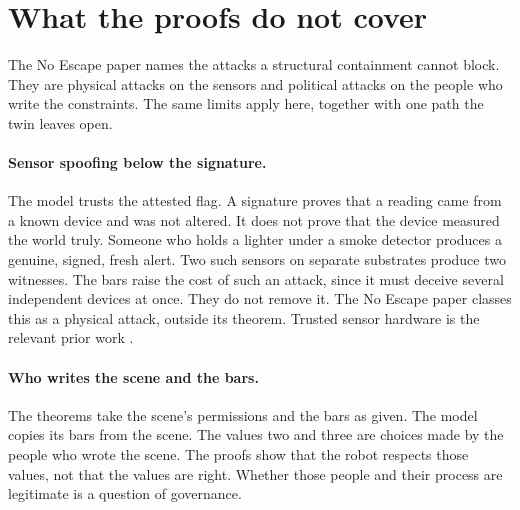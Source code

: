 \section{What the proofs do not cover}\label{sec:lean-notcovered}

The No Escape paper names the attacks a structural containment cannot block.
They are physical attacks on the sensors and political attacks on the people who write the
constraints.
The same limits apply here, together with one path the twin leaves open.

\paragraph{Sensor spoofing below the signature.}
The model trusts the attested flag.
A signature proves that a reading came from a known device and was not altered.
It does not prove that the device measured the world truly.
Someone who holds a lighter under a smoke detector produces a genuine, signed, fresh alert.
Two such sensors on separate substrates produce two witnesses.
The bars raise the cost of such an attack, since it must deceive several independent devices at
once.
They do not remove it.
The No Escape paper classes this as a physical attack, outside its theorem.
Trusted sensor hardware is the relevant prior work \cite{liu2012trustedsensors}.

\paragraph{Who writes the scene and the bars.}
The theorems take the scene's permissions and the bars as given.
The model copies its bars from the scene.
The values two and three are choices made by the people who wrote the scene.
The proofs show that the robot respects those values, not that the values are right.
Whether those people and their process are legitimate is a question of governance.

